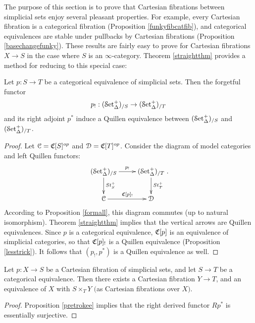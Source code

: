 The purpose of this section is to prove that Cartesian fibrations between simplicial sets enjoy several pleasant properties. For example, every Cartesian fibration is a categorical fibration (Proposition \ref{funkyfibcatfib}), and categorical equivalences are stable under pullbacks by Cartesian fibrations (Proposition \ref{basechangefunky}). These results are fairly easy to prove for Cartesian fibrations $X \rightarrow S$ in the case where $S$ is an $\infty$-category. Theorem \ref{straightthm} provides a method for reducing to this special case:

\begin{proposition}\label{pretrokee}
Let $p: S \rightarrow T$ be a categorical equivalence of simplicial sets. Then the forgetful functor $$p_{!}: (\operatorname{\mathcal{S}et_{\Delta}^{+}})_{/S} \rightarrow (\operatorname{\mathcal{S}et_{\Delta}^{+}})_{/T}$$ and its right adjoint $p^{\ast}$ induce a Quillen equivalence between $(\operatorname{\mathcal{S}et_{\Delta}^{+}})_{/S}$ and $(\operatorname{\mathcal{S}et_{\Delta}^{+}})_{/T}$.
\end{proposition}

\begin{proof}
Let $\operatorname{\mathcal{C}} = \operatorname{\mathfrak{C}}[S]^{op}$ and $\operatorname{\mathcal{D}} = \operatorname{\mathfrak{C}}[T]^{op}$.
Consider the diagram of model categories and left Quillen functors:
$$\xymatrix{ (\mSet)_{/S} \ar[r]^{p_{!}} \ar[d]^{ \St^{+}_{S} } & (\mSet)_{/T} \ar[d]^{\St^{+}_{T}} \\
\calC \ar[r]^{ \sCoNerve[p]_{!} } & \calD }.$$ According to Proposition \ref{formall}, this diagram commutes (up to natural isomorphism). Theorem \ref{straightthm} implies that the vertical arrows are Quillen equivalences. Since $p$ is a categorical equivalence, $\operatorname{\mathfrak{C}}[p]$ is an equivalence of simplicial categories, so that $\operatorname{\mathfrak{C}}[p]_{!}$ is a Quillen equivalence (Proposition \ref{lesstrick}). It follows that $(p_!, p^{\ast})$ is a Quillen equivalence as well. 
\end{proof}

\begin{corollary}\label{tttroke}
Let $p: X \rightarrow S$ be a Cartesian fibration of simplicial sets, and let
$S \rightarrow T$ be a categorical equivalence. Then there exists a Cartesian fibration $Y \rightarrow T$, and an equivalence of $X$ with $S \times_T Y$ $($as Cartesian fibrations over $X${}$)$.
\end{corollary}

\begin{proof}
Proposition \ref{pretrokee} implies that the right derived functor $R p^{\ast}$ is essentially surjective.
\end{proof}

